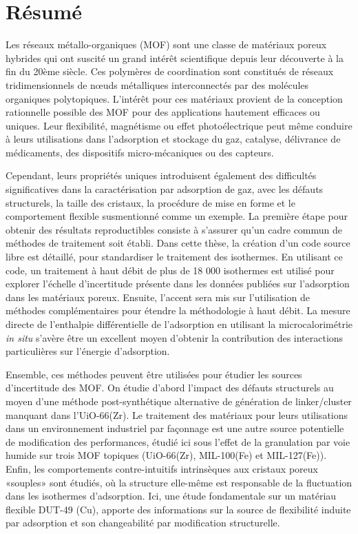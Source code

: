 \pagebreak

\chapter{Résumé}

Les réseaux métallo-organiques (MOF) sont une classe de matériaux poreux
hybrides qui ont suscité un grand intérêt scientifique depuis leur 
découverte à la fin du 20ème siècle. Ces polymères de coordination sont 
constitués de réseaux tridimensionnels de nœuds métalliques interconnectés 
par des molécules organiques polytopiques. L'intérêt pour ces matériaux 
provient de la conception rationnelle possible des MOF pour des 
applications hautement efficaces ou uniques.
Leur flexibilité, magnétisme ou effet photoélectrique
peut même conduire à leurs utilisations dans l'adsorption et stockage du
gaz, catalyse, délivrance de médicaments, des dispositifs micro-mécaniques
ou des capteurs.

Cependant, leurs propriétés uniques introduisent également des difficultés
significatives dans la caractérisation par adsorption de gaz, avec les 
défauts structurels, la taille des cristaux, la procédure de mise 
en forme et le comportement flexible susmentionné comme un exemple. 
La première étape pour obtenir des résultats reproductibles consiste 
à s'assurer qu'un cadre commun de méthodes de traitement 
soit établi. Dans cette thèse, la création d'un code source 
libre est détaillé, 
pour standardiser le traitement des isothermes. En utilisant ce code, 
un traitement à haut débit de plus de 18 000 isothermes est 
utilisé pour explorer l'échelle d'incertitude présente dans les 
données publiées sur l'adsorption dans les matériaux poreux.
Ensuite, l'accent sera mis sur l'utilisation de méthodes complémentaires 
pour étendre la méthodologie à haut débit. La mesure directe de 
l'enthalpie différentielle de l'adsorption en utilisant la
microcalorimétrie \textit{in situ} s'avère être un excellent 
moyen d'obtenir la contribution des interactions particulières sur
l'énergie d'adsorption.

Ensemble, ces méthodes peuvent être utilisées pour étudier les sources 
d'incertitude des MOF. On étudie d’abord l’impact des défauts
structurels au moyen d’une méthode post-synthétique alternative de
génération de linker/cluster manquant dans l'UiO-66(Zr). 
Le traitement des matériaux pour leurs utilisations dans 
un environnement industriel par façonnage est une autre source
potentielle de modification des performances, étudié ici sous l’effet
de la granulation par voie humide sur trois MOF topiques (UiO-66(Zr),
MIL-100(Fe) et MIL-127(Fe)). 
Enfin, les comportements contre-intuitifs intrinsèques aux cristaux poreux 
«souples» sont étudiés, où la structure elle-même est responsable de la 
fluctuation dans les isothermes d'adsorption. Ici, une étude 
fondamentale sur un matériau flexible DUT-49 (Cu), apporte 
des informations sur la source de
flexibilité induite par adsorption et son changeabilité 
par modification structurelle.
